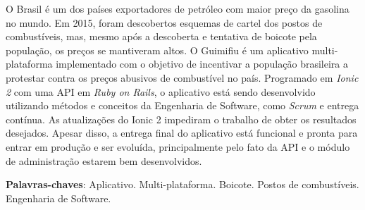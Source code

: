 \begin{resumo}

O Brasil é um dos países exportadores de petróleo com maior preço da gasolina no mundo. Em 2015, foram descobertos esquemas de cartel dos postos de combustíveis, mas, mesmo após a descoberta e tentativa de boicote pela população, os preços se mantiveram altos. O Guimifiu é um aplicativo multi-plataforma implementado com o objetivo de incentivar a população brasileira a protestar contra os preços abusivos de combustível no país. Programado em \textit{Ionic 2} com uma API em \textit{Ruby on Rails}, o aplicativo está sendo desenvolvido utilizando métodos e conceitos da Engenharia de Software, como \textit{Scrum} e entrega contínua. As atualizações do Ionic 2 impediram o trabalho de obter os resultados desejados. Apesar disso, a entrega final do aplicativo está funcional e pronta para entrar em produção e ser evoluída, principalmente pelo fato da API e o módulo de administração estarem bem desenvolvidos.

 \vspace{\onelineskip}

 \noindent
 \textbf{Palavras-chaves}: Aplicativo. Multi-plataforma. Boicote. Postos de combustíveis. Engenharia de Software. 
\end{resumo}
